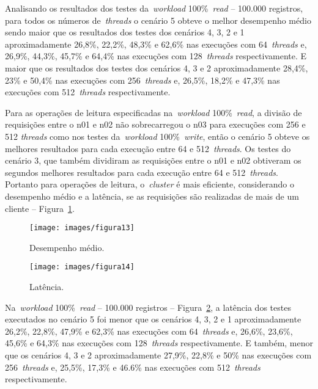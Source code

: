 \documentclass[12pt]{article}
\begin{document}
Analisando os resultados dos testes da~\emph{workload} 100\%~\emph{read} -- 100.000 registros, para todos os números de~\emph{threads} o cenário 5 obteve o melhor desempenho médio sendo maior que os resultados dos testes dos cenários 4, 3, 2 e 1 aproximadamente 26,8\%, 22,2\%, 48,3\% e 62,6\% nas execuções com 64~\emph{threads} e, 26,9\%, 44,3\%, 45,7\% e 64,4\% nas execuções com 128~\emph{threads} respectivamente. E maior que os resultados dos testes dos cenários 4, 3 e 2 aproximadamente 28,4\%, 23\% e 50,4\% nas execuções com 256~\emph{threads} e, 26,5\%, 18,2\% e 47,3\% nas execuções com 512~\emph{threads} respectivamente.

Para as operações de leitura especificadas na~\emph{workload} 100\%~\emph{read}, a divisão de requisições entre o n01 e n02 não sobrecarregou o n03 para execuções com 256 e 512 \emph{threads} como nos testes da~\emph{workload} 100\%~\emph{write}, então o cenário 5 obteve os melhores resultados para cada execução entre 64 e 512~\emph{threads}. Os testes do cenário 3, que também dividiram as requisições entre o n01 e n02 obtiveram os segundos melhores resultados para cada execução entre 64 e 512~\emph{threads}. Portanto para operações de leitura, o~\emph{cluster} é mais eficiente, considerando o desempenho médio e a latência, se as requisições são realizadas de mais de um cliente -- Figura~\ref{figura13}.

\begin{figure*}
    \centering
    \begin{subfigure}[b]{0.49\textwidth}   
        \centering 
        \texttt{[image: images/figura13]}
        \caption{Desempenho médio.}
        \label{figura13}
    \end{subfigure}
    \begin{subfigure}[b]{0.49\textwidth}   
        \centering 
        \texttt{[image: images/figura14]}
        \caption{Latência.}
        \label{figura14}
    \end{subfigure}
    \caption{\emph{Workload} 100\%~\emph{read} -- 100.000 registros nos cenários de 1 a 5.}
\end{figure*}

Na~\emph{workload} 100\%~\emph{read} -- 100.000 registros -- Figura~\ref{figura14}, a latência dos testes executados no cenário 5 foi menor que os cenários 4, 3, 2 e 1 aproximadamente 26,2\%, 22,8\%, 47,9\% e 62,3\% nas execuções com 64~\emph{threads} e, 26,6\%, 23,6\%, 45,6\% e 64,3\% nas execuções com 128~\emph{threads} respectivamente. E também, menor que os cenários 4, 3 e 2 aproximadamente 27,9\%, 22,8\% e 50\% nas execuções com 256~\emph{threads} e, 25,5\%, 17,3\% e 46.6\% nas execuções com 512~\emph{threads} respectivamente.
\end{document}
